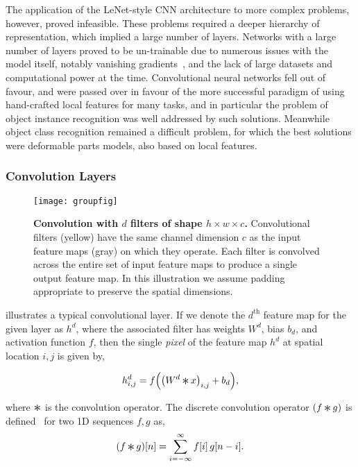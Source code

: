\documentclass[thesis]{subfiles}
\begin{document}
The application of the LeNet-style CNN architecture to more complex problems, however, proved infeasible. These problems required a deeper hierarchy of representation, which implied a large number of layers. Networks with a large number of layers proved to be un-trainable due to numerous issues with the model itself, notably vanishing gradients~\citep{hochreiter1991untersuchungen}, and the lack of large datasets and computational power at the time. Convolutional neural networks fell out of favour, and were passed over in favour of the more successful paradigm of using hand-crafted local features for many tasks, and in particular the problem of object instance recognition was well addressed by such solutions. Meanwhile object class recognition remained a difficult problem, for which the best solutions were deformable parts models, also based on local features.

\subsubsection{Convolution Layers}
\begin{figure}[tb]
	\centering
	\texttt{[image: groupfig]}
	\caption[Illustration of convolutional layer]{\textbf{Convolution with $d$ filters of shape $h\times w\times c$.} Convolutional filters (yellow) have the same channel dimension $c$ as the input feature maps (gray) on which they operate. Each filter is convolved across the entire set of input feature maps to produce a single output feature map. In this illustration we assume padding appropriate to preserve the spatial dimensions.}\label{fig:convlayer}
\end{figure}

 illustrates a typical convolutional layer. If we denote the $d^{\text{th}}$ feature map for the given layer as $h^d$, where the associated filter has weights $W^d$, bias $b_d$, and activation function $f$, then the single \emph{pixel} of the feature map $h^d$ at spatial location $i, j$ is given by,

\begin{equation}
	h^d_{i,j} = f{\left( {\left(W^d \convolution x \right)}_{i,j} + b_d \right)},
\end{equation}

where $\convolution$ is the convolution operator. The discrete convolution operator $(f \convolution g)$ is defined~\citep{damelin2011} for two 1D sequences $f, g$ as,
\begin{equation}
	(f \convolution g)[n] = \sum_{i=-\infty}^\infty f[i]\, g[n - i].
\end{equation}
\end{document}
